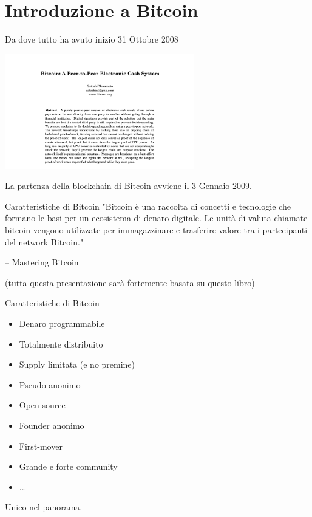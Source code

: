 \documentclass[aspectratio=169]{beamer}
\begin{document}
\section{Introduzione a Bitcoin}

\begin{frame}{Da dove tutto ha avuto inizio}
    31 Ottobre 2008
    \begin{center}
        \includegraphics[height=5cm]{whitepaper.png}
    \end{center}
    La partenza della blockchain di Bitcoin avviene il 3 Gennaio 2009.
\end{frame}

\begin{frame}{Caratteristiche di Bitcoin}
    "Bitcoin è una raccolta di concetti e tecnologie che formano le basi per un
    ecosistema di denaro digitale. Le unità di valuta chiamate bitcoin vengono utilizzate
    per immagazzinare e trasferire valore tra i partecipanti del network Bitcoin."

    -- Mastering Bitcoin

    (tutta questa presentazione sarà fortemente basata su questo libro)
\end{frame}

\begin{frame}{Caratteristiche di Bitcoin}
    \begin{itemize}
        \item Denaro programmabile
        \item Totalmente distribuito
        \item Supply limitata (e no premine)
        \item Pseudo-anonimo
        \item Open-source
        \item Founder anonimo
        \item First-mover
        \item Grande e forte community
        \item ...
    \end{itemize}
    Unico nel panorama. 
\end{frame}
\end{document}
